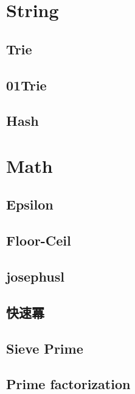 \section{String}

\subsection{Trie}


\subsection{01Trie}


\subsection{Hash}


\section{Math}

\subsection{Epsilon}


\subsection{Floor-Ceil}


\subsection{josephusl}


\subsection{快速冪}


\subsection{Sieve Prime}


\subsection{Prime factorization}


